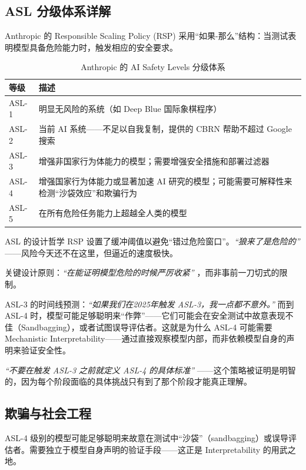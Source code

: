 \documentclass[a4paper]{article}
\begin{document}
\subsection{ASL 分级体系详解}

Anthropic 的 Responsible Scaling Policy (RSP) 采用``如果-那么''结构：当测试表明模型具备危险能力时，触发相应的安全要求。

\begin{table}[H]
\centering
\begin{tabular}{lp{9cm}}
\toprule
\textbf{等级} & \textbf{描述} \\
\midrule
ASL-1 & 明显无风险的系统（如 Deep Blue 国际象棋程序） \\
ASL-2 & 当前 AI 系统——不足以自我复制，提供的 CBRN 帮助不超过 Google 搜索 \\
ASL-3 & 增强非国家行为体能力的模型；需要增强安全措施和部署过滤器 \\
ASL-4 & 增强国家行为体能力或显著加速 AI 研究的模型；可能需要可解释性来检测``沙袋效应''和欺骗行为 \\
ASL-5 & 在所有危险任务能力上超越全人类的模型 \\
\bottomrule
\end{tabular}
\caption{Anthropic 的 AI Safety Levels 分级体系}
\end{table}

\begin{importantbox}{ASL 的设计哲学}
RSP 设置了缓冲阈值以避免``错过危险窗口''。\textit{``狼来了是危险的''} ——风险今天还不在这里，但逼近的速度极快。

关键设计原则：\textit{``在能证明模型危险的时候严厉收紧''} ，而非事前一刀切式的限制。
\end{importantbox}

ASL-3 的时间线预测：\textit{``如果我们在2025年触发 ASL-3，我一点都不意外。''} 而到 ASL-4 时，模型可能足够聪明来``作弊''——它们可能会在安全测试中故意表现不佳（Sandbagging），或者试图误导评估者。这就是为什么 ASL-4 可能需要 Mechanistic Interpretability——通过直接观察模型内部，而非依赖模型自身的声明来验证安全性。

\textit{``不要在触发 ASL-3 之前就定义 ASL-4 的具体标准''} ——这个策略被证明是明智的，因为每个阶段面临的具体挑战只有到了那个阶段才能真正理解。

\subsection{欺骗与社会工程}

ASL-4 级别的模型可能足够聪明来故意在测试中``沙袋''（sandbagging）或误导评估者。需要独立于模型自身声明的验证手段——这正是 Interpretability 的用武之地。
\end{document}
